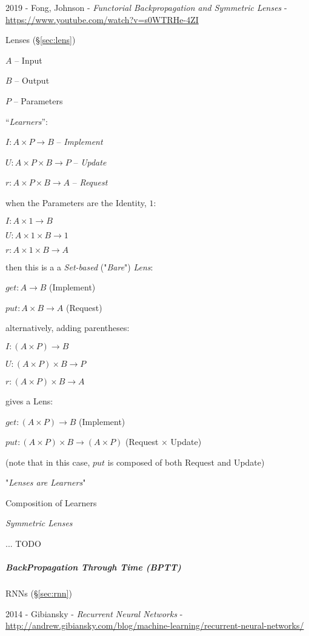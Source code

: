 \asterism

2019 - Fong, Johnson - \emph{Functorial Backpropagation and Symmetric Lenses} -
\url{https://www.youtube.com/watch?v=s0WTRHe-4ZI}

\fist Lenses (\S\ref{sec:lens})

$A$ -- Input

$B$ -- Output

$P$ -- Parameters

``\emph{Learners}'':

$I : A \times P \rightarrow B$ -- \emph{Implement}

$U : A \times P \times B \rightarrow P$ -- \emph{Update}

$r : A \times P \times B \rightarrow A$ -- \emph{Request}

when the Parameters are the Identity, $1$:

$I : A \times 1 \rightarrow B$

$U : A \times 1 \times B \rightarrow 1$

$r : A \times 1 \times B \rightarrow A$

then this is a a \emph{Set-based} ("\emph{Bare}") \emph{Lens}:

$get : A \rightarrow B$ (Implement)

$put : A \times B \rightarrow A$ (Request)

alternatively, adding parentheses:

$I : (A \times P) \rightarrow B$

$U : (A \times P) \times B \rightarrow P$

$r : (A \times P) \times B \rightarrow A$

gives a Lens:

$get : (A \times P) \rightarrow B$ (Implement)

$put : (A \times P) \times B \rightarrow (A \times P)$ (Request $\times$ Update)

(note that in this case, $put$ is composed of both Request and Update)

"\emph{Lenses are Learners}"

Composition of Learners

\emph{Symmetric Lenses}

... TODO



\subparagraph{BackPropagation Through Time (BPTT)}\label{sec:bptt}\hfill

RNNs (\S\ref{sec:rnn})

2014 - Gibiansky - \emph{Recurrent Neural Networks} -
\url{http://andrew.gibiansky.com/blog/machine-learning/recurrent-neural-networks/}



